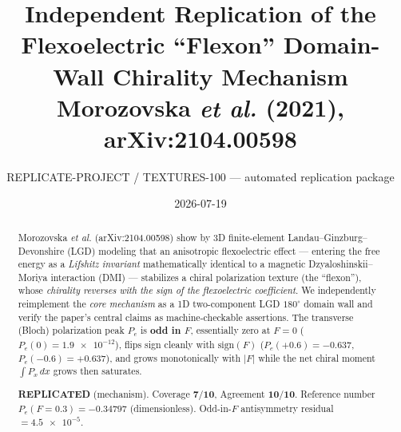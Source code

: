 \documentclass[11pt]{article}
\title{Independent Replication of the Flexoelectric ``Flexon'' Domain-Wall
Chirality Mechanism\\[4pt]
\large Morozovska \textit{et al.} (2021), arXiv:2104.00598}
\author{REPLICATE-PROJECT / TEXTURES-100 --- automated replication package}
\date{2026-07-19}
\begin{document}
\maketitle

\begin{abstract}
Morozovska \textit{et al.} (arXiv:2104.00598) show by 3D finite-element
Landau--Ginzburg--Devonshire (LGD) modeling that an anisotropic flexoelectric
effect --- entering the free energy as a \emph{Lifshitz invariant}
mathematically identical to a magnetic Dzyaloshinskii--Moriya interaction (DMI)
--- stabilizes a chiral polarization texture (the ``flexon''), whose
\emph{chirality reverses with the sign of the flexoelectric coefficient}. We
independently reimplement the \emph{core mechanism} as a 1D two-component LGD
$180^\circ$ domain wall and verify the paper's central claims as
machine-checkable assertions. The transverse (Bloch) polarization peak $P_e$ is
\textbf{odd in $F$}, essentially zero at $F=0$
($P_e(0)=\num{1.9e-12}$), flips sign cleanly with $\mathrm{sign}(F)$
($P_e(+0.6)=-0.637$, $P_e(-0.6)=+0.637$), and grows monotonically with $|F|$
while the net chiral moment $\int P_x\,dx$ grows then saturates.
\begin{tcolorbox}[colback=green!5,colframe=green!45!black,title=Verdict]
\textbf{REPLICATED} (mechanism). Coverage $\mathbf{7/10}$, Agreement
$\mathbf{10/10}$. Reference number $P_e(F{=}0.3)=\mathbf{-0.34797}$ (dimensionless).
Odd-in-$F$ antisymmetry residual $=\num{4.5e-5}$.
\end{tcolorbox}
\end{abstract}
\end{document}
